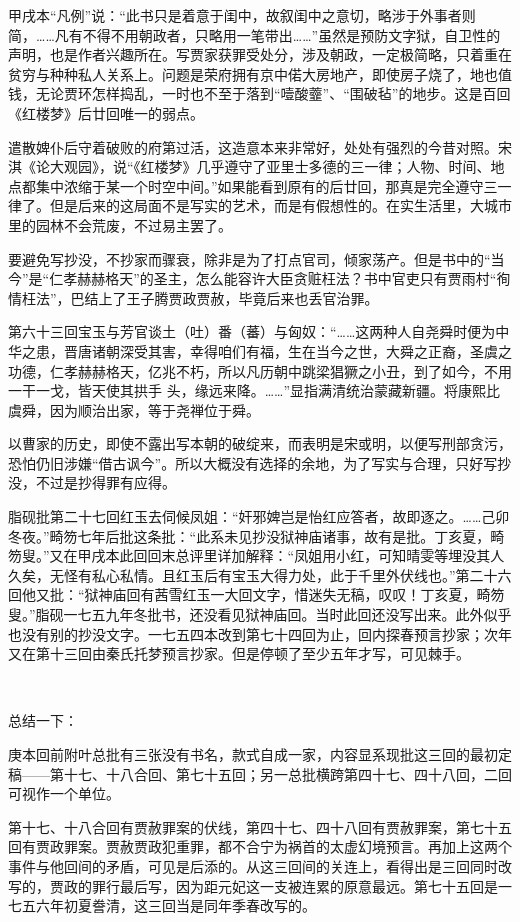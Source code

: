 \par 甲戌本“凡例”说：“此书只是着意于闺中，故叙闺中之意切，略涉于外事者则简，……凡有不得不用朝政者，只略用一笔带出……”虽然是预防文字狱，自卫性的声明，也是作者兴趣所在。写贾家获罪受处分，涉及朝政，一定极简略，只着重在贫穷与种种私人关系上。问题是荣府拥有京中偌大房地产，即使房子烧了，地也值钱，无论贾环怎样捣乱，一时也不至于落到“噎酸虀”、“围破毡”的地步。这是百回《红楼梦》后廿回唯一的弱点。
\par 遣散婢仆后守着破败的府第过活，这造意本来非常好，处处有强烈的今昔对照。宋淇《论大观园》，说“《红楼梦》几乎遵守了亚里士多德的三一律；人物、时间、地点都集中浓缩于某一个时空中间。”如果能看到原有的后廿回，那真是完全遵守三一律了。但是后来的这局面不是写实的艺术，而是有假想性的。在实生活里，大城市里的园林不会荒废，不过易主罢了。
\par 要避免写抄没，不抄家而骤衰，除非是为了打点官司，倾家荡产。但是书中的“当今”是“仁孝赫赫格天”的圣主，怎么能容许大臣贪赃枉法？书中官吏只有贾雨村“徇情枉法”，巴结上了王子腾贾政贾赦，毕竟后来也丢官治罪。
\par 第六十三回宝玉与芳官谈土（吐）番（蕃）与匈奴：“……这两种人自尧舜时便为中华之患，晋唐诸朝深受其害，幸得咱们有福，生在当今之世，大舜之正裔，圣虞之功德，仁孝赫赫格天，亿兆不朽，所以凡历朝中跳梁猖獗之小丑，到了如今，不用一干一戈，皆天使其拱手 头，缘远来降。……”显指满清统治蒙藏新疆。将康熙比虞舜，因为顺治出家，等于尧禅位于舜。
\par 以曹家的历史，即使不露出写本朝的破绽来，而表明是宋或明，以便写刑部贪污，恐怕仍旧涉嫌“借古讽今”。所以大概没有选择的余地，为了写实与合理，只好写抄没，不过是抄得罪有应得。
\par 脂砚批第二十七回红玉去伺候凤姐：“奸邪婢岂是怡红应答者，故即逐之。……己卯冬夜。”畸笏七年后批这条批：“此系未见抄没狱神庙诸事，故有是批。丁亥夏，畸笏叟。”又在甲戌本此回回末总评里详加解释：“凤姐用小红，可知晴雯等埋没其人久矣，无怪有私心私情。且红玉后有宝玉大得力处，此于千里外伏线也。”第二十六回他又批：“狱神庙回有茜雪红玉一大回文字，惜迷失无稿，叹叹！丁亥夏，畸笏叟。”脂砚一七五九年冬批书，还没看见狱神庙回。当时此回还没写出来。此外似乎也没有别的抄没文字。一七五四本改到第七十四回为止，回内探春预言抄家；次年又在第十三回由秦氏托梦预言抄家。但是停顿了至少五年才写，可见棘手。
\par  
\par 总结一下：
\par 庚本回前附叶总批有三张没有书名，款式自成一家，内容显系现批这三回的最初定稿——第十七、十八合回、第七十五回；另一总批横跨第四十七、四十八回，二回可视作一个单位。
\par 第十七、十八合回有贾赦罪案的伏线，第四十七、四十八回有贾赦罪案，第七十五回有贾政罪案。贾赦贾政犯重罪，都不合宁为祸首的太虚幻境预言。再加上这两个事件与他回间的矛盾，可见是后添的。从这三回间的关连上，看得出是三回同时改写的，贾政的罪行最后写，因为距元妃这一支被连累的原意最远。第七十五回是一七五六年初夏誊清，这三回当是同年季春改写的。
